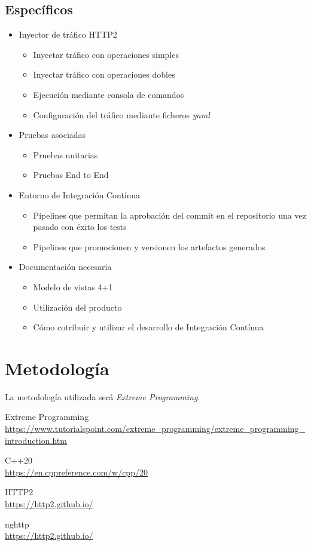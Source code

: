\subsection{Específicos}
\begin{itemize}
    \item Inyector de tráfico HTTP2
    \begin{itemize}
        \item Inyectar tráfico con operaciones simples
        \item Inyectar tráfico con operaciones dobles
        \item Ejecución mediante consola de comandos
        \item Configuración del tráfico mediante ficheros \emph{yaml}
    \end{itemize}
    \item Pruebas asociadas
    \begin{itemize}
        \item Pruebas unitarias
        \item Pruebas End to End
    \end{itemize}
    \item Entorno de Integración Contínua
    \begin{itemize}
        \item Pipelines que permitan la aprobación del commit en el repositorio una vez pasado con éxito los tests
        \item Pipelines que promocionen y versionen los artefactos generados
    \end{itemize}
    \item Documentación necesaria
    \begin{itemize}
        \item Modelo de vistas 4+1
        \item Utilización del producto
        \item Cómo cotribuir y utilizar el desarrollo de Integración Contínua
    \end{itemize}
\end{itemize}

\section{Metodología}
La metodología utilizada será \emph{Extreme Programming}.


\newpage
\begin{thebibliography}{Bibliografía}
Extreme Programming
\\\url{https://www.tutorialspoint.com/extreme_programming/extreme\_programming\_introduction.htm}

C++20
\\\url{https://en.cppreference.com/w/cpp/20}

HTTP2
\\\url{https://http2.github.io/}

nghttp
\\\url{https://http2.github.io/}
\end{thebibliography}